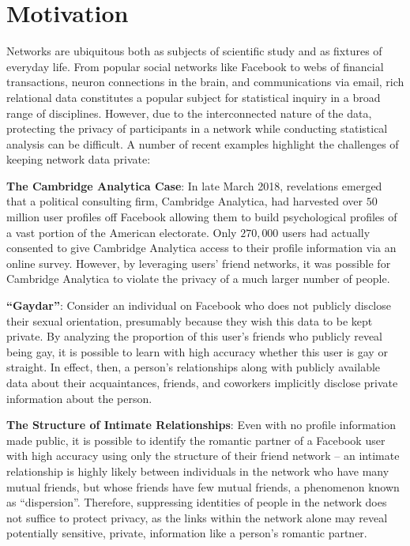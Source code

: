 \section{Motivation}

Networks are ubiquitous both as subjects of scientific study and as fixtures of everyday life. From popular social networks like Facebook to webs of financial transactions, neuron connections in the brain, and communications via email, rich relational data constitutes a popular subject for statistical inquiry in a broad range of disciplines. However, due to the interconnected nature of the data, protecting the privacy of participants in a network while conducting statistical analysis can be difficult. A number of recent examples highlight the challenges of keeping network data private:

\textbf{The Cambridge Analytica Case}:
In late March 2018, revelations emerged that a political consulting firm, Cambridge Analytica, had harvested over $50$ million user profiles off Facebook allowing them to build psychological profiles of a vast portion of the American electorate. Only $270,000$ users had actually consented to give Cambridge Analytica access to their profile information via an online survey. However, by leveraging users' friend networks, it was possible for Cambridge Analytica to violate the privacy of a much larger number of people. 
\cite{nytimes}

\textbf{``Gaydar''}:
Consider an individual on Facebook who does not publicly disclose their sexual orientation, presumably because they wish this data to be kept private. By analyzing the proportion of this user's friends who publicly reveal being gay, it is possible to learn with high accuracy whether this user is gay or straight. In effect, then, a person's relationships along with publicly available data about their acquaintances, friends, and coworkers implicitly disclose private information about the person. \cite{JM09}

\textbf{The Structure of Intimate Relationships}:
Even with no profile information made public, it is possible to identify the romantic partner of a Facebook user with high accuracy using only the structure of their friend network -- an intimate relationship is highly likely between individuals in the network who have many mutual friends, but whose friends have few mutual friends, a phenomenon known as ``dispersion''. Therefore, suppressing identities of people in the network does not suffice to protect privacy, as the links within the network alone may reveal potentially sensitive, private, information like a person's romantic partner.  \cite{BK14}

